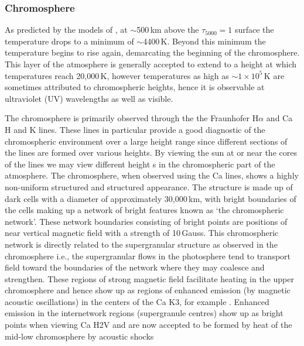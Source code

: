\subsubsection{Chromosphere}\label{sec:122}

As predicted by the models of \citep{vernazza1981, fontenla1988, gabriel1976}, at $\sim$500\,km above the $\tau_{5000}=1$ surface the temperature drops to a minimum of $\sim$4400\,K. Beyond this minimum the temperature begins to rise again, demarcating the beginning of the chromosphere. This layer of the atmosphere is generally accepted to extend to a height at which temperatures reach 20,000\,K, however temperatures as high as $\sim$$1\times10^5$\,K are sometimes attributed to chromospheric heights, hence it is observable at ultraviolet (UV) wavelengths as well as visible. 

The chromosphere is primarily observed through the the Fraunhofer H$\alpha$ and Ca H and K lines. These lines in particular provide a good diagnostic of the chromospheric environment over a large height range since different sections of the lines are formed over various heights. By viewing the sun at or near the cores of the lines we may view different height s in the chromospheric part of the atmosphere. The chromosphere, when observed using the Ca lines, shows a highly non-uniform structured and structured appearance. The structure is made up of dark cells with a diameter of approximately 30,000\,km, with bright boundaries of the cells making up a network of bright features known as \textquoteleft the chromospheric network'. These network boundaries consisting of bright points are positions of near vertical magnetic field with a strength of 10\,Gauss. This chromospheric network is directly related to the supergranular structure as observed in the chromosphere i.e., the supergranular flows in the photosphere tend to transport field toward the boundaries of the network where they may coalesce and strengthen. These regions of strong magnetic field facilitate heating in the upper chromosphere and hence show up as regions of enhanced emission (by magnetic acoustic oscillations) in the centers of the Ca K3, for example \citep{mcateer2002}. Enhanced emission in the internetwork regions (supergranule centres) show up as bright points when viewing Ca H2V and are now accepted to be formed by heat of the mid-low chromosphere by acoustic shocks \citep{carlsson1997}

